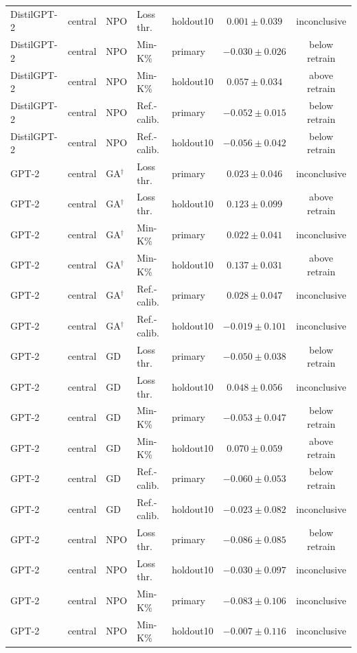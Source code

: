 {\begin{longtable}{@{\extracolsep{\fill}}lllllcc@{}}
DistilGPT-2 & central & NPO & Loss thr. & holdout10 & $0.001 \pm 0.039$ & inconclusive \\
DistilGPT-2 & central & NPO & Min-K\% & primary & $-0.030 \pm 0.026$ & below retrain \\
DistilGPT-2 & central & NPO & Min-K\% & holdout10 & $0.057 \pm 0.034$ & above retrain \\
DistilGPT-2 & central & NPO & Ref.-calib. & primary & $-0.052 \pm 0.015$ & below retrain \\
DistilGPT-2 & central & NPO & Ref.-calib. & holdout10 & $-0.056 \pm 0.042$ & below retrain \\
GPT-2 & central & GA$^{\dagger}$ & Loss thr. & primary & $0.023 \pm 0.046$ & inconclusive \\
GPT-2 & central & GA$^{\dagger}$ & Loss thr. & holdout10 & $0.123 \pm 0.099$ & above retrain \\
GPT-2 & central & GA$^{\dagger}$ & Min-K\% & primary & $0.022 \pm 0.041$ & inconclusive \\
GPT-2 & central & GA$^{\dagger}$ & Min-K\% & holdout10 & $0.137 \pm 0.031$ & above retrain \\
GPT-2 & central & GA$^{\dagger}$ & Ref.-calib. & primary & $0.028 \pm 0.047$ & inconclusive \\
GPT-2 & central & GA$^{\dagger}$ & Ref.-calib. & holdout10 & $-0.019 \pm 0.101$ & inconclusive \\
GPT-2 & central & GD & Loss thr. & primary & $-0.050 \pm 0.038$ & below retrain \\
GPT-2 & central & GD & Loss thr. & holdout10 & $0.048 \pm 0.056$ & inconclusive \\
GPT-2 & central & GD & Min-K\% & primary & $-0.053 \pm 0.047$ & below retrain \\
GPT-2 & central & GD & Min-K\% & holdout10 & $0.070 \pm 0.059$ & above retrain \\
GPT-2 & central & GD & Ref.-calib. & primary & $-0.060 \pm 0.053$ & below retrain \\
GPT-2 & central & GD & Ref.-calib. & holdout10 & $-0.023 \pm 0.082$ & inconclusive \\
GPT-2 & central & NPO & Loss thr. & primary & $-0.086 \pm 0.085$ & below retrain \\
GPT-2 & central & NPO & Loss thr. & holdout10 & $-0.030 \pm 0.097$ & inconclusive \\
GPT-2 & central & NPO & Min-K\% & primary & $-0.083 \pm 0.106$ & inconclusive \\
GPT-2 & central & NPO & Min-K\% & holdout10 & $-0.007 \pm 0.116$ & inconclusive \\

\end{longtable}}
